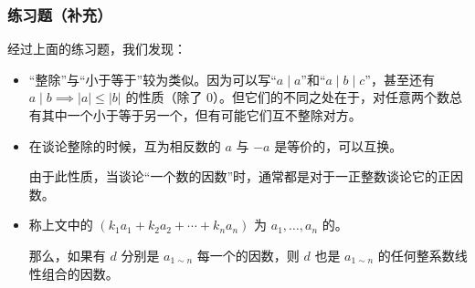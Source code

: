 \begin{frame}
  \frametitle{练习题（补充）}
  经过上面的练习题，我们发现：
  \pause
  \begin{itemize}
    \item “整除”与“小于等于”较为类似。因为可以写“$a \mid a$”和“$a \mid b \mid c$”，甚至还有 $a \mid b \implies \lvert a \rvert \le \lvert b \rvert$ 的性质（除了 $0$）。但它们的不同之处在于，对任意两个数总有其中一个小于等于另一个，但有可能它们\alert{互不整除}对方。
    \pause
    \item 在谈论整除的时候，互为\alert{相反数}的 $a$ 与 $-a$ 是等价的，可以互换。
    
    由于此性质，当谈论“一个数的因数”时，通常都是对于一\alert{正}整数谈论它的\alert{正}因数。
    \pause
    \item 称上文中的 $(k_1 a_1 + k_2 a_2 + \cdots + k_n a_n)$ 为 $a_1, \ldots, a_n$ 的。
    
    那么，如果有 $d$ 分别是 $a_{1 \sim n}$ 每一个的因数，则 $d$ 也是 $a_{1 \sim n}$ 的任何整系数线性组合的因数。
  \end{itemize}
\end{frame}
